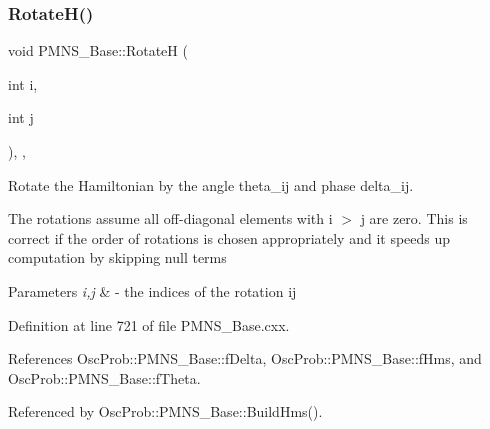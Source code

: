 \subsubsection{\texorpdfstring{Rotate\+H()}{RotateH()}}
{\footnotesize\ttfamily void P\+M\+N\+S\+\_\+\+Base\+::\+RotateH (\begin{DoxyParamCaption}\item[{int}]{i,  }\item[{int}]{j }\end{DoxyParamCaption})\hspace{0.3cm}{\ttfamily [protected]}, {\ttfamily [virtual]}, {\ttfamily [inherited]}}

Rotate the Hamiltonian by the angle theta\+\_\+ij and phase delta\+\_\+ij.

The rotations assume all off-\/diagonal elements with i $>$ j are zero. This is correct if the order of rotations is chosen appropriately and it speeds up computation by skipping null terms


\begin{DoxyParams}{Parameters}
{\em i,j} & -\/ the indices of the rotation ij \\
\hline
\end{DoxyParams}


Definition at line 721 of file P\+M\+N\+S\+\_\+\+Base.\+cxx.



References Osc\+Prob\+::\+P\+M\+N\+S\+\_\+\+Base\+::f\+Delta, Osc\+Prob\+::\+P\+M\+N\+S\+\_\+\+Base\+::f\+Hms, and Osc\+Prob\+::\+P\+M\+N\+S\+\_\+\+Base\+::f\+Theta.



Referenced by Osc\+Prob\+::\+P\+M\+N\+S\+\_\+\+Base\+::\+Build\+Hms().


